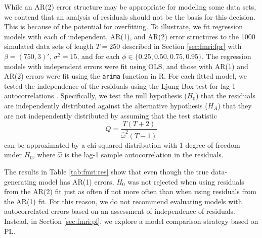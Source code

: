 While an AR(2) error structure may be appropriate for modeling some data sets, we contend that an analysis of residuals should not be the basis for this decision. This is because of the potential for overfitting. To illustrate, we fit regression models with each of independent, AR(1), and AR(2) error structures to the 1000 simulated data sets of length $T = 250$ described in Section \ref{sec:fmri:fpr} with $\beta = (750,3)'$, $\sigma^2 = 15$, and for each $\phi \in \{0.25,0.50,0.75,0.95\}$. The regression models with independent errors were fit using OLS, and those with AR(1) and AR(2) errors were fit using the {\tt arima} function in R. For each fitted model, we tested the independence of the residuals using the Ljung-Box test for lag-1 autocorrelations \citep{box:test:1978}. Specifically, we test the null hypothesis ($H_0$) that the residuals are independently distributed against the alternative hypothesis ($H_A$) that they are not independently distributed by assuming that the test statistic
\begin{equation}
Q = \frac{T(T+2)}{\hat{\omega}^2(T-1)} \label{eqn:box}
\end{equation}
can be approximated by a chi-squared distribution with 1 degree of freedom under $H_0$, where $\hat{\omega}$ is the lag-1 sample autocorrelation in the residuals.
 
The results in Table \ref{tab:fmri:res} show that even though the true data-generating model has AR(1) errors, $H_0$ was not rejected when using residuals from the AR(2) fit just as often if not more often than when using residuals from the AR(1) fit. For this reason, we do not recommend evaluating models with autocorrelated errors based on an assessment of independence of residuals. Instead, in Section \ref{sec:fmri:pl}, we explore a model comparison strategy based on PL.

